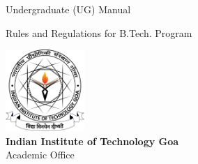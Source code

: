 {\fontsize{32pt}{0pt} \selectfont \color{blue} Undergraduate (UG) Manual}

{\fontsize{15pt}{0pt} \selectfont \color{gray} Rules and Regulations for B.Tech. Program}


\vspace{17cm}


\begin{center}
    \includegraphics[width=3cm]{Media/IIT-Goa-Logo-Black-on-White.png}\\
    \textbf{Indian Institute of Technology Goa}\\
    Academic Office
\end{center}